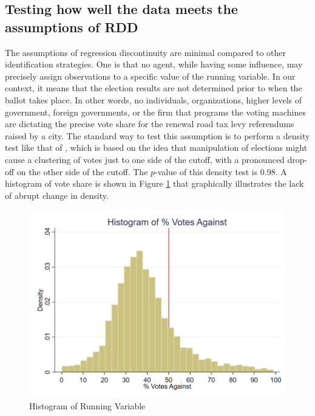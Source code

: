 \subsection{Testing how well the data meets the assumptions of RDD}
The assumptions of regression discontinuity are minimal compared to other identification strategies. One is that no agent, while having some influence, may precisely assign observations to a specific value of the running variable. In our context, it means that the election results are not determined prior to when the ballot takes place. In other words, no individuals, organizations, higher levels of government, foreign governments, or the firm that programs the voting machines are dictating the precise vote share for the renewal road tax levy referendums raised by a city. The standard way to test this assumption is to perform a density test like that of \cite{cattaneo2020simple}, which is based on the idea that manipulation of elections might cause a clustering of votes just to one side of the cutoff, with a pronounced drop-off on the other side of the cutoff. The $p$-value of this density test is 0.98. A histogram of vote share is shown in Figure \ref{fig:running_var_hist} that graphically illustrates the lack of abrupt change in density.

\begin{figure}[ht]
    \centering
    \includegraphics[width=\textwidth,keepaspectratio]{images/votes_pct_against_histogram.png}
    \caption{Histogram of Running Variable}
    \label{fig:running_var_hist}
\end{figure}

